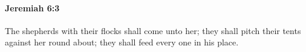 
		\paragraph{Jeremiah 6:3} %
			\label{JEREMIAH-6-3}

			The shepherds with their flocks shall come unto her; they shall pitch their tents against her round about; they shall feed every one in his place.


